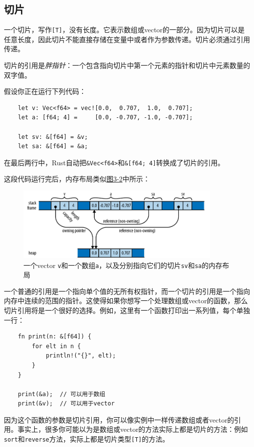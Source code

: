 \subsection{切片}\label{slice}

一个切片，写作\texttt{[T]}，没有长度。它表示数组或vector的一部分。因为切片可以是任意长度，因此切片不能直接存储在变量中或者作为参数传递。切片必须通过引用传递。

切片的引用是\emph{胖指针}：一个包含指向切片中第一个元素的指针和切片中元素数量的双字值。

假设你正在运行下列代码：
\begin{verbatim}
    let v: Vec<f64> = vec![0.0,  0.707,  1.0,  0.707];
    let a: [f64; 4] =     [0.0, -0.707, -1.0, -0.707];

    let sv: &[f64] = &v;
    let sa: &[f64] = &a;
\end{verbatim}

在最后两行中，Rust自动把\texttt{\&Vec<f64>}和\texttt{\&[f64; 4]}转换成了切片的引用。

这段代码运行完后，内存布局类似\hyperref[f3-2]{图3-2}中所示：
\begin{figure}[htbp]
    \centering
    \includegraphics[width=0.9\textwidth]{../img/f3-2.png}
    \caption{一个vector \texttt{v}和一个数组\texttt{a}，以及分别指向它们的切片\texttt{sv}和\texttt{sa}的内存布局}
    \label{f3-2}
\end{figure}

一个普通的引用是一个指向单个值的无所有权指针，而一个切片的引用是一个指向内存中连续的范围的指针。这使得如果你想写一个处理数组或vector的函数，那么切片引用将是一个很好的选择。例如，这里有一个函数打印出一系列值，每个单独一行：
\begin{verbatim}
    fn print(n: &[f64]) {
        for elt in n {
            println!("{}", elt);
        }
    }

    print(&a);  // 可以用于数组
    print(&v);  // 可以用于vector
\end{verbatim}

因为这个函数的参数是切片引用，你可以像实例中一样传递数组或者vector的引用。事实上，很多你可能以为是数组或vector的方法实际上都是切片的方法：例如\texttt{sort}和\texttt{reverse}方法，实际上都是切片类型\texttt{[T]}的方法。

